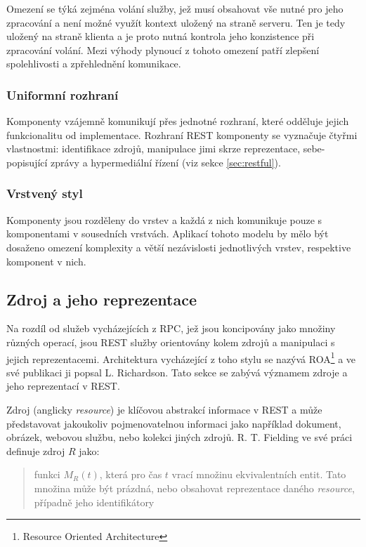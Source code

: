 \documentclass[czech,DP]{thesiskiv}
\begin{document}
Omezení se týká zejména volání služby, jež musí obsahovat vše nutné pro jeho zpracování a není možné využít kontext uložený na straně serveru. Ten je tedy uložený na straně klienta a je proto nutná kontrola jeho konzistence při zpracování volání. Mezi výhody plynoucí z tohoto omezení patří zlepšení spolehlivosti a zpřehlednění komunikace.

\subsubsection{Uniformní rozhraní}

Komponenty vzájemně komunikují přes jednotné rozhraní, které odděluje jejich funkcionalitu od implementace. Rozhraní REST komponenty se vyznačuje čtyřmi vlastnostmi: identifikace zdrojů, manipulace jimi skrze reprezentace, sebe-popisující zprávy a hypermediální řízení (viz sekce \ref{sec:restful}).

\subsubsection{Vrstvený styl}
Komponenty jsou rozděleny do vrstev a každá z nich komunikuje pouze s komponentami v sousedních vrstvách. Aplikací tohoto modelu by mělo být dosaženo omezení komplexity a větší nezávislosti jednotlivých vrstev, respektive komponent v nich.

\subsection{Zdroj a jeho reprezentace}
\label{sec:rest-basics}

Na rozdíl od služeb vycházejících z RPC, jež jsou koncipovány jako množiny různých operací, jsou REST služby orientovány kolem zdrojů a manipulaci s jejich reprezentacemi. Architektura vycházející z toho stylu se nazývá ROA\footnote{Resource Oriented Architecture} a ve své publikaci \cite{restfulWebServices} ji popsal L. Richardson. Tato sekce se zabývá významem zdroje a jeho reprezentací v REST.

Zdroj (anglicky \textit{resource}) je klíčovou abstrakcí informace v REST a může představovat jakoukoliv pojmenovatelnou informaci jako například dokument, obrázek, webovou službu, nebo  kolekci jiných zdrojů. R. T. Fielding ve své práci \cite{fielding2000rest} definuje zdroj $R$ jako: 

\begin{quote}
	funkci $M_R(t)$, která pro čas $t$ vrací množinu ekvivalentních entit. Tato množina může být prázdná, nebo obsahovat reprezentace daného \textit{resource}, případně jeho identifikátory
\end{quote}
\end{document}

